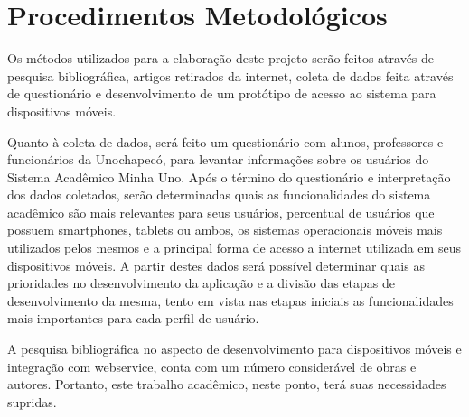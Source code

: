 \section{Procedimentos Metodológicos}

Os métodos utilizados para a elaboração deste projeto serão feitos através de pesquisa bibliográfica, artigos retirados da internet, coleta de dados feita através de questionário e desenvolvimento de um protótipo de acesso ao sistema para dispositivos móveis.

Quanto à coleta de dados, será feito um questionário com alunos, professores e funcionários da Unochapecó, para levantar informações sobre os usuários do Sistema Acadêmico Minha Uno.  Após o término do questionário e interpretação dos dados coletados, serão determinadas quais as funcionalidades do sistema acadêmico são mais relevantes para seus usuários, percentual de usuários que possuem smartphones, tablets ou ambos, os sistemas operacionais móveis mais utilizados pelos mesmos e a principal forma de acesso a internet utilizada em seus dispositivos móveis. A partir destes dados será possível determinar quais as prioridades no desenvolvimento da aplicação e a divisão das etapas de desenvolvimento da mesma, tento em vista nas etapas iniciais as funcionalidades mais importantes para cada perfil de usuário.

A pesquisa bibliográfica no aspecto de desenvolvimento para dispositivos móveis e integração com webservice, conta com um número considerável de obras e autores. Portanto, este trabalho acadêmico, neste ponto, terá suas necessidades supridas.


